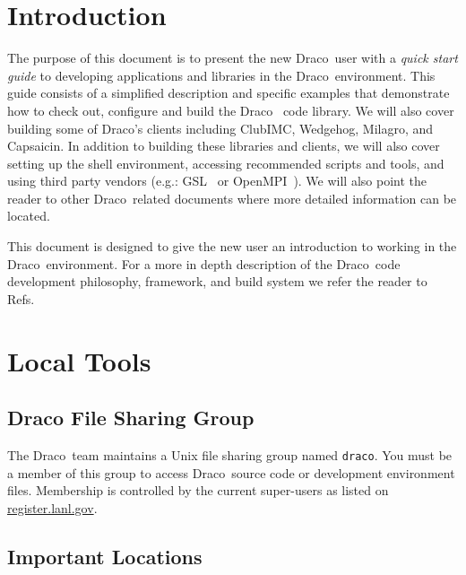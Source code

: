 \documentclass[11pt]{nmemo}
\newcommand{\comp}[1]{\normalfont\footnotesize\texttt{#1}\normalsize}
\newcommand{\draco}{{\normalfont\sffamily Draco}}
\newcommand{\capsaicin}{{\normalfont\sffamily Capsaicin}}
\newcommand{\clubimc}{{\normalfont\sffamily ClubIMC}}
\newcommand{\wedgehog}{{\normalfont\sffamily Wedgehog}}
\newcommand{\milagro}{{\normalfont\sffamily Milagro}}
\newcommand{\gsl}{{\normalfont\sffamily GSL}}
\newcommand{\openmpi}{{\normalfont\sffamily OpenMPI}}
\begin{document}
\section{Introduction}

The purpose of this document is to present the new \draco\ user with a
\emph{quick start guide} to developing applications and libraries in
the \draco\ environment.  This guide consists of a simplified
description and specific examples that demonstrate how to check out,
configure and build the \draco~\cite{rn98046} code library.  We will
also cover building some of \draco's clients including \clubimc,
\wedgehog, \milagro, and \capsaicin.  In addition to building these
libraries and clients, we will also cover setting up the shell
environment, accessing recommended scripts and tools, and using third
party vendors (e.g.: \gsl~\cite{gslref} or
\openmpi~\cite{openmpiweb}).  We will also point the reader to other
\draco\ related documents where more detailed information can be
located.

This document is designed to give the new user an introduction to
working in the \draco\ environment.  For a more in depth description
of the \draco\ code development philosophy, framework, and build
system we refer the reader to
Refs.~\cite{rn98046,draco-build,xtm:9909,doxygen,draco-purify,ccs-4:04-35,ccs-2:12-04}


\section{Local Tools}

\subsection{Draco File Sharing Group}

The \draco\ team maintains a Unix file sharing group named
\comp{draco}.  You must be a member of this group to access
\draco\ source code or development environment files.  Membership is
controlled by the current super-users as listed on
\url{register.lanl.gov}. 
\subsection{Important Locations}
\end{document}
